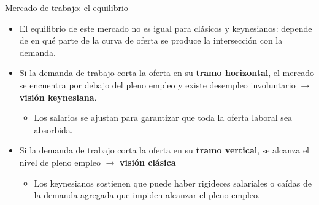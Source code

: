 \documentclass{beamer}
\begin{document}
\begin{frame}{Mercado de trabajo: el equilibrio}

    \begin{itemize}
        \item El equilibrio de este mercado no es igual para clásicos y keynesianos: depende de en qué parte de la curva de oferta se produce la intersección con la demanda.
        \item Si la demanda de trabajo corta la oferta en su \textbf{tramo horizontal}, el mercado se encuentra por debajo del pleno empleo y existe desempleo involuntario $\rightarrow$ \textbf{visión keynesiana}.
            \begin{itemize}
            \item Los salarios se ajustan para garantizar que toda la oferta laboral sea absorbida. 
            \end{itemize}
        \item Si la demanda de trabajo corta la oferta en su \textbf{tramo vertical}, se alcanza el nivel de pleno empleo $\rightarrow$ \textbf{visión clásica}
            \begin{itemize}
            \item Los keynesianos sostienen que puede haber rigideces salariales o caídas de la demanda agregada que impiden alcanzar el pleno empleo.
            \end{itemize}
    \end{itemize}
\end{frame}
\end{document}
